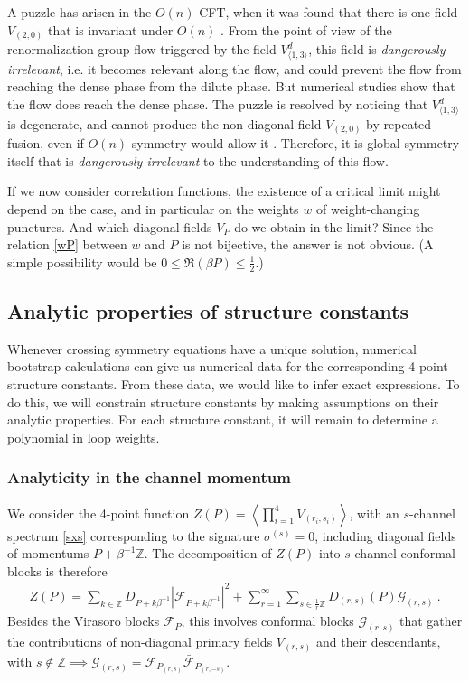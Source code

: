 \documentclass[12pt, a4paper]{article}
\theoremstyle{break}
\begin{document}
A puzzle has arisen in the $O(n)$ CFT, when it was found that there is one field $V_{(2,0)}$ that is invariant under $O(n)$ \cite{gz20}. From the point of view of the renormalization group flow triggered by the field $V^d_{\langle 1,3\rangle}$, this field is \textit{dangerously irrelevant}, i.e. it becomes relevant along the flow, and could prevent the flow from reaching the dense phase from the dilute phase. But numerical studies show that the flow does reach the dense phase. The puzzle is resolved by noticing that $V^d_{\langle 1,3\rangle}$ is degenerate, and cannot produce the non-diagonal field $V_{(2,0)}$ by repeated fusion, even if $O(n)$ symmetry would allow it \cite{js23}. Therefore, it is global symmetry itself that is \textit{dangerously irrelevant} to the understanding of this flow. 

If we now consider correlation functions, the existence of a critical limit might depend on the case, and in particular on the weights $w$ of weight-changing punctures. And which diagonal fields $V_P$ do we obtain in the limit? Since the relation \eqref{wP} between $w$ and $P$ is not bijective, the answer is not obvious. (A simple possibility would be $0\leq \Re(\beta P)\leq \frac12$.) 


\subsection{Analytic properties of structure constants}

Whenever crossing symmetry equations have a unique solution, numerical bootstrap calculations can give us numerical data for the corresponding 4-point structure constants. From these data, we would like to infer exact expressions. To do this, we will constrain structure constants by making assumptions on their analytic properties. 
For each structure constant, it will remain to determine a polynomial in loop weights.

\subsubsection{Analyticity in the channel momentum}

We consider the 4-point function $Z(P)=\left<\prod_{i=1}^4 V_{(r_i,s_i)}\right>$, with an $s$-channel spectrum 
\eqref{sxs} corresponding to the signature $\sigma^{(s)}=0$, including 
diagonal fields of momentums $P+\beta^{-1}\mathbb{Z}$. The decomposition of $Z(P)$ into $s$-channel conformal blocks is therefore
\begin{align}
 Z(P) = \sum_{k\in\mathbb{Z}} D_{P+k\beta^{-1}} \left|\mathcal{F}_{P+k\beta^{-1}}\right|^2 +\sum_{r=1}^\infty \sum_{s\in\frac{1}{r}\mathbb{Z}} D_{(r,s)}(P) \mathcal{G}_{(r,s)}\ .
\end{align}
Besides the Virasoro blocks $\mathcal{F}_P$, this involves conformal blocks $\mathcal{G}_{(r,s)}$ that gather the contributions of non-diagonal primary fields $V_{(r,s)}$ and their descendants, with $s\notin\mathbb{Z}\implies \mathcal{G}_{(r,s)} = \mathcal{F}_{P_{(r,s)}}\bar{\mathcal{F}}_{P_{(r,-s)}}$. 
\end{document}
